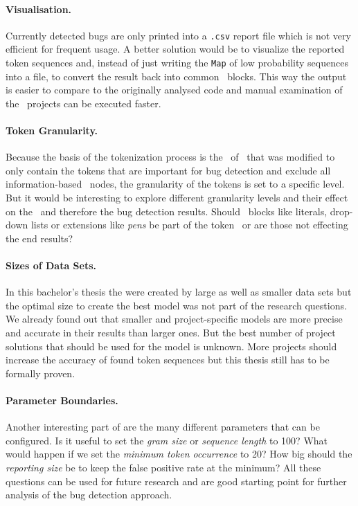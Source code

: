 \paragraph{Visualisation.}
Currently detected bugs are only printed into a \texttt{.csv} report file which is not very efficient for frequent usage. A better solution would be to visualize the reported token sequences and, instead of just writing the \texttt{Map} of low probability sequences into a file, to convert the result back into common \scratch\ blocks. This way the output is easier to compare to the originally analysed code and manual examination of the \scratch\ projects can be executed faster. 

\paragraph{Token Granularity.}
Because the basis of the tokenization process is the \AST\ of \litterbox\ that was modified to only contain the tokens that are important for bug detection and exclude all information-based \AST\ nodes, the granularity of the tokens is set to a specific level. But it would be interesting to explore different granularity levels and their effect on the \ngram\ and therefore the bug detection results. Should \scratch\ blocks like literals, drop-down lists or extensions like \textit{pens} be part of the token \AST\ or are those not effecting the end results? 

\paragraph{Sizes of Data Sets.}
In this bachelor's thesis the  were created by large as well as smaller data sets but the optimal size to create the best model was not part of the research questions. We already found out that smaller and project-specific models are more precise and accurate in their results than larger ones. But the best number of project solutions that should be used for the model is unknown. More projects should increase the accuracy of found token sequences but this thesis still has to be formally proven.  

\paragraph{Parameter Boundaries.}
Another interesting part of  are the many different parameters that can be configured. Is it useful to set the \textit{gram size} or \textit{sequence length} to 100? What would happen if we set the \textit{minimum token occurrence} to 20? How big should the \textit{reporting size} be to keep the false positive rate at the minimum? All these questions can be used for future research and are good starting point for further analysis of the \ngram{} bug detection approach.






 
